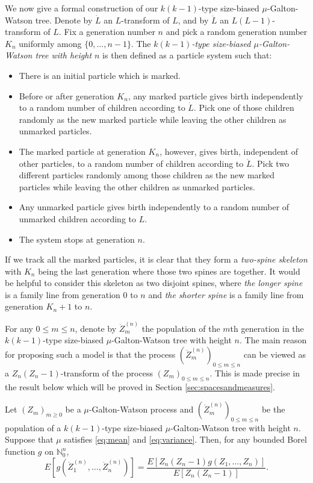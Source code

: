 \documentclass[ECP]{ejpecp} %
\begin{document}
We now give a formal construction of our $k(k-1)$-type size-biased $\mu$-Galton-Watson tree.
Denote by $\dot L$ an $L$-transform of $L$, and by $\ddot L$ an $L(L-1)$-transform of $L$.
Fix a generation number $n$ and pick a random generation number $K_n$ uniformly among $\{0,\dots,n-1\}$.
The \emph{$k(k-1)$-type size-biased $\mu$-Galton-Watson tree with height $n$} is then defined as a particle system such that:
\begin{itemize}
	\item
	There is an initial particle which is marked.
	\item
	Before or after generation $K_n$, any marked particle gives birth independently to a random number of children according to $\dot L$.
	Pick one of those children randomly as the new marked particle while leaving the other children as unmarked particles.
	\item
	The marked particle at generation $K_n$, however, gives birth, independent of other particles, to a random number of children according to $\ddot L$.
	Pick two different particles randomly among those children as the new marked particles while leaving the other children as unmarked particles.
	\item
	Any unmarked particle gives birth independently to a random number of unmarked children according to $L$.
	\item
	The system stops at generation $n$.
\end{itemize}

If we track all the marked particles, it is clear that they form a \emph{two-spine skeleton} with $K_n$ being the last generation where those two spines are together.
It would be helpful to consider this skeleton as two disjoint spines,
where \emph{the longer spine} is a family line from generation $0$ to $n$ and \emph{the shorter spine} is a family line from generation $K_n+1$ to $n$.

For any $0\le m \le n$, denote by $\ddot Z_m^{(n)}$ the population of the $m$th generation in the $k(k-1)$-type size-biased $\mu$-Galton-Watson tree with height $n$.
The main reason for proposing such a model is that the process $(\ddot Z_m^{(n)})_{0\le m\le n}$ can be viewed as
a $Z_n(Z_n-1)$-transform of the process $(Z_m)_{0\le m\le n}$.
This is made precise in the result below which will be proved in Section \ref{sec:spacesandmeasures}.
\begin{theorem}
	\label{thm: change of measure}
	Let $(Z_m)_{m\ge 0}$ be a $\mu$-Galton-Watson process and $(\ddot Z_m^{(n)})_{0\le m\le n}$ be the population of a $k(k-1)$-type size-biased $\mu$-Galton-Watson tree with height $n$.
	Suppose that $\mu$ satisfies \eqref{eq:mean} and \eqref{eq:variance}.
	Then, for any bounded Borel function $g$ on $\mathbb N^{n}_0$,
	\[
	E[ g ( \ddot Z_1^{(n)}, \dots, \ddot Z_n^{(n)})]
	=
	\frac{ E[ Z_n(Z_n-1) g( Z_1, \dots, Z_n)]} {E [ Z_n ( Z_n - 1)]}.		
	\]
\end{theorem}
\end{document}
